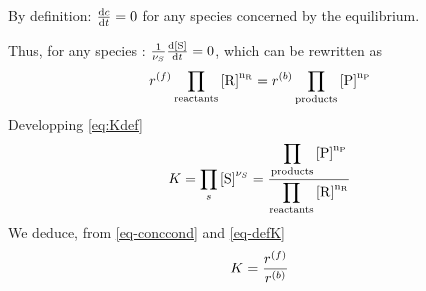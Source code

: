 By definition: $\frac{\dd \conc}{\dd t} = 0$ for any species concerned by the equilibrium.

Thus, for any species : 
$\frac{1}{\scoef[S]}\frac{\dd\conc[S]}{\dd t} =  0$, which can be rewritten as
\begin{equation}
\fwdrate \prodReac = \bkwdrate \prodProd
\label{eq-conccond}
\end{equation}
Developping \ref{eq:Kdef}
\begin{equation}
\Eqconst = \prod_{s}\conc[S]^{\scoef[S]} 
          = \frac{\displaystyle\prodProd}
                 {\displaystyle\prodReac}
\label{eq-defK}
\end{equation}
We deduce, from \ref{eq-conccond} and \ref{eq-defK}
\begin{equation}
\Eqconst = \frac{\fwdrate}{\bkwdrate}
\end{equation}
